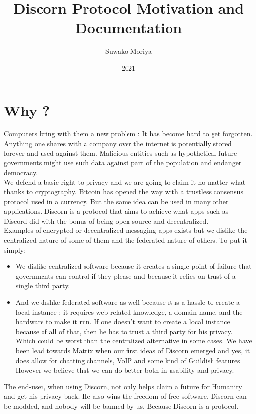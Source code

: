 \documentclass[a4paper,10pt]{article}
\title{Discorn Protocol Motivation and Documentation}
\author{Suwako Moriya}
\date{2021}
\begin{document}
    \maketitle
    \section{Why ?}
        Computers bring with them a new problem : It has become hard to get forgotten.
        Anything one shares with a company over the internet is potentially stored forever and used against them.
        Malicious entities such as hypothetical future governments might use such data against part of the population
        and endanger democracy.\\
        
        We defend a basic right to privacy and we are going to claim it no matter what thanks to cryptography.
        Bitcoin has opened the way with a trustless consensus protocol used in a currency. But the same idea
        can be used in many other applications. Discorn is a protocol that aims to achieve what apps such as Discord did
        with the bonus of being open-source and decentralized.\\
        
        
        Examples of encrypted or decentralized messaging apps exists but we dislike the centralized nature of some of them
        and the federated nature of others. To put it simply:
        \begin{itemize}
         \item We dislike centralized software because it creates a single point of failure that governments can control
         if they please and because it relies on trust of a single third party.
        
        \item And we dislike federated software as well because it is a hassle to create a local instance : it requires web-related
         knowledge, a domain name, and the hardware to make it run. If one doesn't want to create a local instance because of all of that,
         then he has to trust a third party for his privacy. Which could be worst than the centralized alternative in some cases.
         We have been lead towards Matrix when our first ideas of Discorn emerged and yes, it does allow for chatting channels, VoIP and some kind of Guildish features
         However we believe that we can do better both in usability and privacy.
        \end{itemize}
        The end-user, when using Discorn, not only helps claim a future for Humanity and get his privacy back. He also wins the freedom
        of free software. Discorn can be modded, and nobody will be banned by us. Because Discorn is a protocol.
    
\end{document}
